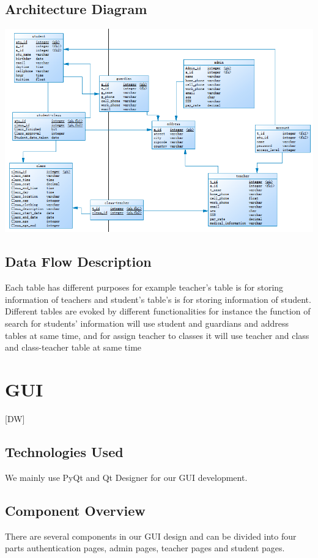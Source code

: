 \subsection{ Architecture  Diagram}
\includegraphics[scale=0.8]{pics/database.png}\\


\subsection{Data Flow Description}
Each table has different purposes for example teacher's table is for storing information of teachers and student's table's is for storing information of student. Different tables are evoked by different functionalities for instance the function of search for students' information will use student and guardians and address tables at same time, and for assign teacher to classes it will use teacher and class and class-teacher table at same time


\section{GUI}
[DW]
\subsection{Technologies  Used}
We mainly use PyQt and Qt Designer for our GUI development.

\subsection{Component  Overview}
There are several components in our GUI design and can be divided into four parts authentication pages, admin pages, teacher pages and student pages.

